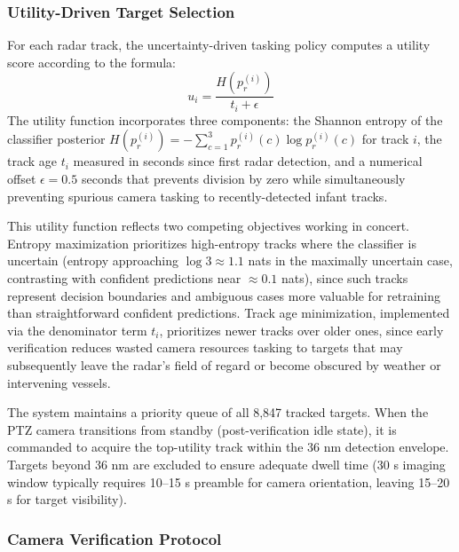 \documentclass[conf]{asmeconf}
\begin{document}
\subsubsection{Utility-Driven Target Selection}

For each radar track, the uncertainty-driven tasking policy computes a utility score according to the formula:
\begin{equation}
u_i = \frac{H(p_r^{(i)})}{t_i + \epsilon}
\label{eq:utility}
\end{equation}
The utility function incorporates three components: the Shannon entropy of the classifier posterior $H(p_r^{(i)}) = -\sum_{c=1}^{3} p_r^{(i)}(c) \log p_r^{(i)}(c)$ for track $i$, the track age $t_i$ measured in seconds since first radar detection, and a numerical offset $\epsilon=0.5$ seconds that prevents division by zero while simultaneously preventing spurious camera tasking to recently-detected infant tracks.

This utility function reflects two competing objectives working in concert. Entropy maximization prioritizes high-entropy tracks where the classifier is uncertain (entropy approaching $\log 3 \approx 1.1$ nats in the maximally uncertain case, contrasting with confident predictions near $\approx 0.1$ nats), since such tracks represent decision boundaries and ambiguous cases more valuable for retraining than straightforward confident predictions. Track age minimization, implemented via the denominator term $t_i$, prioritizes newer tracks over older ones, since early verification reduces wasted camera resources tasking to targets that may subsequently leave the radar's field of regard or become obscured by weather or intervening vessels.

The system maintains a priority queue of all 8,847 tracked targets. When the PTZ camera transitions from standby (post-verification idle state), it is commanded to acquire the top-utility track within the 36 nm detection envelope. Targets beyond 36 nm are excluded to ensure adequate dwell time (30 s imaging window typically requires 10--15 s preamble for camera orientation, leaving 15--20 s for target visibility).

\subsubsection{Camera Verification Protocol}
\end{document}
